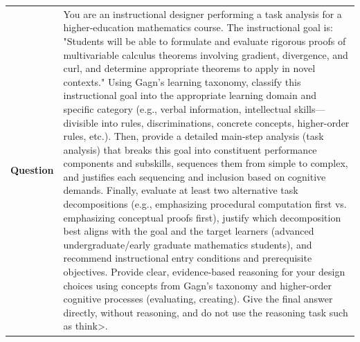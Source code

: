 \begin{longtable}{@{}l p{12.5cm}@{}}
  \textbf{Question} & You are an instructional designer performing a task analysis for a higher-education mathematics course. The instructional goal is: "Students will be able to formulate and evaluate rigorous proofs of multivariable calculus theorems involving gradient, divergence, and curl, and determine appropriate theorems to apply in novel contexts." Using Gagn's learning taxonomy, classify this instructional goal into the appropriate learning domain and specific category (e.g., verbal information, intellectual skills---divisible into rules, discriminations, concrete concepts, higher-order rules, etc.). Then, provide a detailed main-step analysis (task analysis) that breaks this goal into constituent performance components and subskills, sequences them from simple to complex, and justifies each sequencing and inclusion based on cognitive demands. Finally, evaluate at least two alternative task decompositions (e.g., emphasizing procedural computation first vs. emphasizing conceptual proofs first), justify which decomposition best aligns with the goal and the target learners (advanced undergraduate/early graduate mathematics students), and recommend instructional entry conditions and prerequisite objectives. Provide clear, evidence-based reasoning for your design choices using concepts from Gagn's taxonomy and higher-order cognitive processes (evaluating, creating). \newline Give the final answer directly, without reasoning, and do not use the reasoning task such as think\textgreater{}. \\

\end{longtable}
